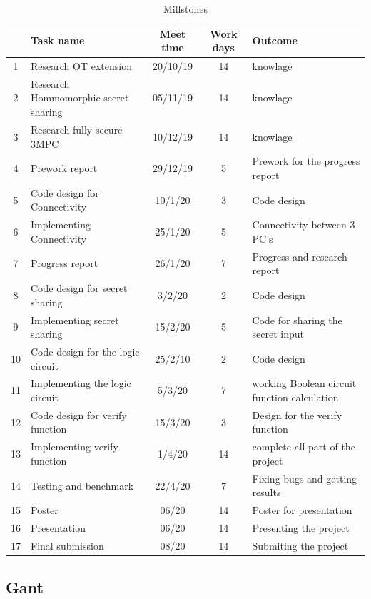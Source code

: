 \documentclass[12pt]{article}
\begin{document}
\begin{table}
\caption{Millstones}
\begin{center}
\begin{tabular}{|c|p{4 cm}|c|c|p{3.5 cm}|}
	\hline
	 & Task name & Meet time &Work days& Outcome \\	
	\hline 
	1&Research OT extension& 20/10/19 & 14 & knowlage \\ 
	\hline
	2&Research Hommomorphic secret sharing& 05/11/19 & 14 & knowlage \\
	\hline
	3&Research fully secure 3MPC& 10/12/19 & 14 & knowlage \\
	\hline
	4&Prework report& 29/12/19 & 5 &Prework for the progress report \\
	\hline
	5&Code design for Connectivity & 10/1/20 & 3 & Code design\\
	\hline
	6&Implementing Connectivity& 25/1/20 & 5 & Connectivity between 3 PC's\\
	\hline
	7&Progress report & 26/1/20 & 7 & Progress and research report \\
	\hline
	8&Code design for secret sharing  & 3/2/20 & 2 & Code design\\
	\hline
	9&Implementing secret sharing  & 15/2/20 & 5 &Code for sharing the secret input \\
	\hline
	10&Code design for the logic circuit  & 25/2/10 & 2 & Code design\\
	\hline
	11&Implementing the logic circuit  & 5/3/20 & 7 & working Boolean circuit function calculation\\
	\hline
	12&Code design for verify function  & 15/3/20 & 3 & Design for the verify function\\	
	\hline
	13&Implementing verify function  & 1/4/20 & 14 & complete all part of the project\\	
	\hline
	14&Testing and benchmark & 22/4/20 & 7 & Fixing bugs and getting results\\
	\hline
	15&Poster & 06/20 & 14 & Poster for presentation\\
	\hline
	16&Presentation & 06/20 & 14 &Presenting the project\\
	\hline
	17&Final submission & 08/20 & 14 & Submiting the project\\
	\hline
\end{tabular}
\end{center}
\label{tab:Millstones}
\end{table}

\pagebreak
\subsection{Gant}
\end{document}

